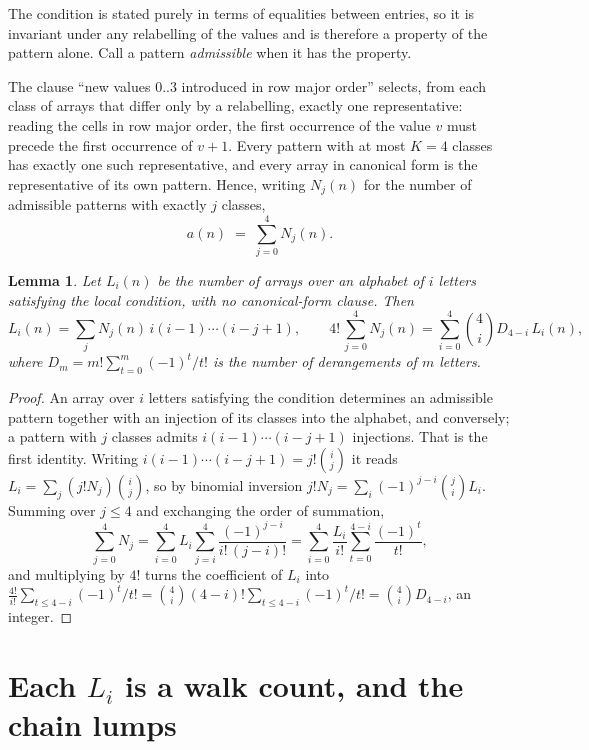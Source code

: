 \documentclass[11pt,a4paper]{article}
\theoremstyle{plain}
\newtheorem{lemma}[theorem]{Lemma}
\theoremstyle{definition}
\begin{document}
The condition is stated purely in terms of equalities between entries, so it is invariant
under any relabelling of the values and is therefore a property of the pattern alone. Call a
pattern \emph{admissible} when it has the property.

The clause ``new values $0..3$ introduced in row major order'' selects, from each class
of arrays that differ only by a relabelling, exactly one representative: reading the cells in
row major order, the first occurrence of the value $v$ must precede the first occurrence of
$v+1$. Every pattern with at most $K=4$ classes has exactly one such representative, and
every array in canonical form is the representative of its own pattern. Hence, writing
$N_j(n)$ for the number of admissible patterns with exactly $j$ classes,
\begin{equation}\label{eq:apat}
a(n)\;=\;\sum_{j=0}^{4}N_j(n).
\end{equation}

\begin{lemma}\label{lem:inv}
Let $L_i(n)$ be the number of arrays over an alphabet of $i$ letters satisfying the local
condition, with no canonical-form clause. Then
\[
L_i(n)=\sum_j N_j(n)\,i(i-1)\cdots(i-j+1),
\qquad
4!\,\sum_{j=0}^{4}N_j(n)=\sum_{i=0}^{4}\binom{4}{i}D_{4-i}\,L_i(n),
\]
where $D_m=m!\sum_{t=0}^{m}(-1)^t/t!$ is the number of derangements of $m$ letters.
\end{lemma}

\begin{proof}
An array over $i$ letters satisfying the condition determines an admissible pattern together
with an injection of its classes into the alphabet, and conversely; a pattern with $j$
classes admits $i(i-1)\cdots(i-j+1)$ injections. That is the first identity. Writing
$i(i-1)\cdots(i-j+1)=j!\binom{i}{j}$ it reads $L_i=\sum_j (j!N_j)\binom{i}{j}$, so by
binomial inversion $j!N_j=\sum_{i}(-1)^{j-i}\binom{j}{i}L_i$. Summing over
$j\le 4$ and exchanging the order of summation,
\[
\sum_{j=0}^{4}N_j=\sum_{i=0}^{4}L_i\sum_{j=i}^{4}\frac{(-1)^{j-i}}{i!\,(j-i)!}
=\sum_{i=0}^{4}\frac{L_i}{i!}\sum_{t=0}^{4-i}\frac{(-1)^t}{t!} ,
\]
and multiplying by $4!$ turns the coefficient of $L_i$ into
$\frac{4!}{i!}\sum_{t\le 4-i}(-1)^t/t!=\binom{4}{i}(4-i)!\sum_{t\le 4-i}(-1)^t/t!
=\binom{4}{i}D_{4-i}$, an integer.
\end{proof}

\section{Each $L_i$ is a walk count, and the chain lumps}
\end{document}
